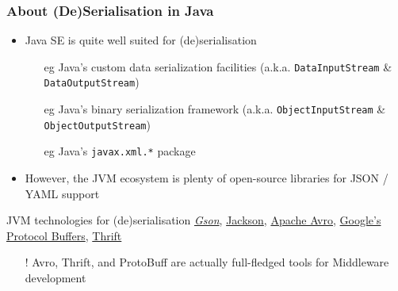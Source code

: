\documentclass[presentation]{beamer}\mode<presentation>{\usetheme{AMSBolognaFC}}
\begin{document}
\begin{frame}%
    \frametitle{About (De)Serialisation in Java}

    \begin{itemize}
        \item Java SE is quite well suited for (de)serialisation
        \begin{itemize}
            \item[eg] Java's custom data serialization facilities (a.k.a. \texttt{DataInputStream} \& \texttt{DataOutputStream})
            \item[eg] Java's binary serialization framework (a.k.a. \texttt{ObjectInputStream} \& \texttt{ObjectOutputStream})
            \item[eg] Java's \texttt{javax.xml.*} package
        \end{itemize}

        \vfill

        \item However, the JVM ecosystem is plenty of open-source libraries for JSON / YAML support

    \end{itemize}

    \vfill

    \begin{block}{JVM technologies for (de)serialisation}
        \href{https://github.com/google/gson}{\emph{Gson}},
        \href{https://github.com/FasterXML/jackson}{Jackson},
        \href{https://avro.apache.org/docs/1.10.0/}{Apache Avro},
        \href{https://developers.google.com/protocol-buffers}{Google's Protocol Buffers},
        \href{https://thrift.apache.org/}{Thrift}
    \end{block}
    \begin{itemize}\small
        \item[!] Avro, Thrift, and ProtoBuff are actually full-fledged tools for Middleware development
    \end{itemize}

\end{frame}
\end{document}
